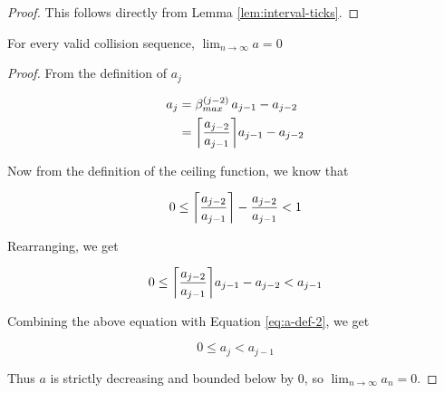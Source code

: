 \begin{proof}
	This follows directly from Lemma \ref{lem:interval-ticks}.
\end{proof}


\begin{theorem}
	For every valid collision sequence, $\lim_{n \to \infty} a = 0$
\end{theorem}

\begin{proof}
	From the definition of $a_j$

	\begin{align}\label{eq:a-def-2}
		a_j& = \beta^{(j-2)}_{max} \, a_{j-1} - a_{j-2}\\
		& =  \ceil{\frac{a_{j-2}}{a_{j-1}}} a_{j-1} - a_{j-2}
	\end{align}

	Now from the definition of the ceiling function, we know that

	\begin{equation}
		0 \le \ceil{\frac{a_{j-2}}{a_{j-1}}} - \frac{a_{j-2}}{a_{j-1}} < 1
	\end{equation}

	Rearranging, we get

	\begin{equation}
		0 \le \ceil{\frac{a_{j-2}}{a_{j-1}}} a_{j-1} - a_{j-2} < a_{j-1}
	\end{equation}

	Combining the above equation with Equation \ref{eq:a-def-2}, we get

	\begin{equation}
		0 \le a_j < a_{j-1}
	\end{equation}

	Thus $a$ is strictly decreasing and bounded below by 0, so $\lim_{n \to \infty} a_n = 0$.
\end{proof}